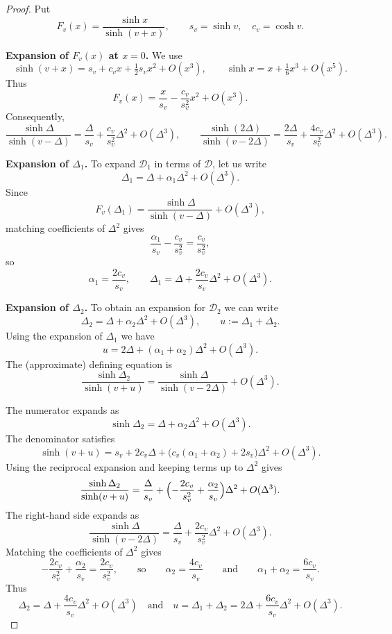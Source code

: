 \documentclass[10pt,a4paper]{amsart}
\def\DD{{\mathcal{D}}}
\def\a{\alpha}
\begin{document}
\begin{proof}
	Put
	\[
	F_v(x)=\frac{\sinh x}{\sinh(v+x)}, 
	\qquad s_v=\sinh v,\quad c_v=\cosh v.
	\]
	
	\medskip
	\noindent\textbf{Expansion of $F_v(x)$ at $x=0$.}  
	We use
	\[
	\sinh(v+x)=s_v + c_v x + \tfrac12 s_v x^2 + O(x^3), 
	\qquad
	\sinh x = x + \tfrac{1}{6}x^3 + O(x^5).
	\]
	Thus
	\[
	F_v(x)
	= \frac{x}{s_v} - \frac{c_v}{s_v^2}x^2 + O(x^3).
	\]
	Consequently,
	\[
	\frac{\sinh \Delta}{\sinh(v-\Delta)}
	= \frac{\Delta}{s_v} + \frac{c_v}{s_v^2}\Delta^2 + O(\Delta^3),
	\qquad
	\frac{\sinh (2\Delta)}{\sinh(v-2\Delta)}
	= \frac{2\Delta}{s_v} + \frac{4c_v}{s_v^2}\Delta^2 + O(\Delta^3).
	\]
	
	\medskip
	\noindent\textbf{Expansion of $\Delta_1$.}
	To expand $\DD_1$ in terms of $\DD$, let us write
	\[
	\Delta_1=\Delta+\alpha_1 \Delta^2+O(\Delta^3).
	\]
	Since
	\[
	F_v(\Delta_1)=\frac{\sinh\Delta}{\sinh(v-\Delta)} + O(\Delta^3),
	\]
	matching coefficients of $\Delta^2$ gives
	\[
	\frac{\alpha_1}{s_v}-\frac{c_v}{s_v^2}= \frac{c_v}{s_v^2},
	\]
	so
	\[
	\alpha_1=\frac{2c_v}{s_v},
	\qquad
	\Delta_1=\Delta+\frac{2c_v}{s_v}\Delta^2+O(\Delta^3).
	\]
	
	\medskip
	\noindent\textbf{Expansion of $\Delta_2$.} 
	To obtain an expansion for $\DD_2$ we can write
	\[
	\Delta_2=\Delta+\alpha_2\Delta^2+O(\Delta^3),\qquad
	u:=\Delta_1+\Delta_2.
	\]
	Using the expansion of $\Delta_1$ we have
	\[
	u=2\Delta+(\alpha_1+\alpha_2)\Delta^2+O(\Delta^3).
	\]
	The (approximate) defining equation is
	\[
	\frac{\sinh\Delta_2}{\sinh(v+u)}
	= \frac{\sinh\Delta}{\sinh(v-2\Delta)} + O(\Delta^3).
	\]
	
	The numerator expands as
	\[
	\sinh\Delta_2=\Delta+\alpha_2\Delta^2+O(\Delta^3).
	\]
	The denominator satisfies
	\[
	\sinh(v+u)=s_v + 2c_v\Delta 
	+ \bigl(c_v(\alpha_1+\alpha_2)+2s_v\bigr)\Delta^2 + O(\Delta^3).
	\]
	Using the reciprocal expansion and keeping terms up to $\Delta^2$ gives
	\[
	\frac{\sinh\Delta_2}{\sinh(v+u)}
	= \frac{\Delta}{s_v}
	+ \Bigl(-\frac{2c_v}{s_v^2}+\frac{\alpha_2}{s_v}\Bigr)\Delta^2
	+ O(\Delta^3).
	\]
	The right-hand side expands as
	\[
	\frac{\sinh\Delta}{\sinh(v-2\Delta)}
	= \frac{\Delta}{s_v} + \frac{2c_v}{s_v^2}\Delta^2 + O(\Delta^3).
	\]
	Matching the coefficients of $\Delta^2$ gives
	\[
	-\frac{2c_v}{s_v^2}+\frac{\alpha_2}{s_v}
	= \frac{2c_v}{s_v^2},
	\qquad
	\text{so}\qquad
	\alpha_2=\frac{4c_v}{s_v}\qquad
	\text{and}\qquad
\a_1+	\alpha_2=\frac{6c_v}{s_v}.
	\]
	Thus
	\[
	\Delta_2=\Delta+\frac{4c_v}{s_v}\Delta^2+O(\Delta^3)\quad\text{and}\quad
	u=\Delta_1+\Delta_2=2\Delta+\frac{6c_v}{s_v}\Delta^2+O(\Delta^3).
	\]
	

\end{proof}
\end{document}
